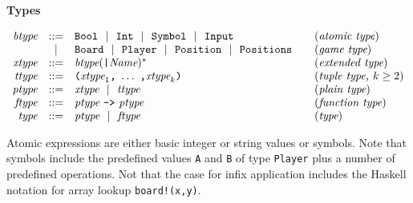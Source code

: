 \documentclass[11pt]{article}
\makeatletter
\newcommand{\prodName}[1]{&(\emph{#1})\\}
\newcommand{\nt}[1]{\textit{#1}}
\newcommand{\prog}[1]{\texttt{#1}}
\newcommand{\ORil}{\ \ |\ \ }
\newcommand{\IS}{&::=&}
\newcommand{\OR}{&|&}
\newcommand{\syntax}[2]{
  \needspace{3\baselineskip}
  \bigskip\par\noindent\textbf{#1}\par\smallskip%
  $\begin{array}{rcl@{\qquad}l}#2\end{array}$%
  \par\bigskip\noindent\ignorespaces
}
\newcommand{\lp}{\prog{(}}
\newcommand{\rp}{\prog{)}}
\newcommand{\paren}[1]{\lp#1\rp}
\makeatother
\begin{document}
\syntax{Types}{
\nt{btype}    \IS  \prog{Bool} \ORil \prog{Int} \ORil
                   \prog{Symbol} \ORil \prog{Input}
                                                         \prodName{atomic type}
              \OR  \prog{Board} \ORil \prog{Player} \ORil
                   \prog{Position} \ORil \prog{Positions}
                                                           \prodName{game type}
\nt{xtype}    \IS  \nt{btype}(\prog{|}\nt{Name})^*
                                                       \prodName{extended type}
\nt{ttype}    \IS  \paren{\nt{xtype}_1\prog{,}\ \ldots\ \prog{,}\nt{xtype}_k}
                                               \prodName{tuple type, $k\geq 2$}
\nt{ptype}     \IS  \nt{xtype} \ORil \nt{ttype}
                                                          \prodName{plain type}
\nt{ftype}    \IS  \nt{ptype}\ \prog{->}\ \nt{ptype}   \prodName{function type}
\nt{type}     \IS  \nt{ptype} \ORil \nt{ftype}
                                                                \prodName{type}
}
%
Atomic expressions are either basic integer or string values or symbols. Note
that symbols include the predefined values \prog{A} and \prog{B} of type
\prog{Player} plus a number of predefined operations.
%
Not that the case for infix application includes the Haskell notation for array
lookup \prog{board!(x,y)}.
\end{document}
